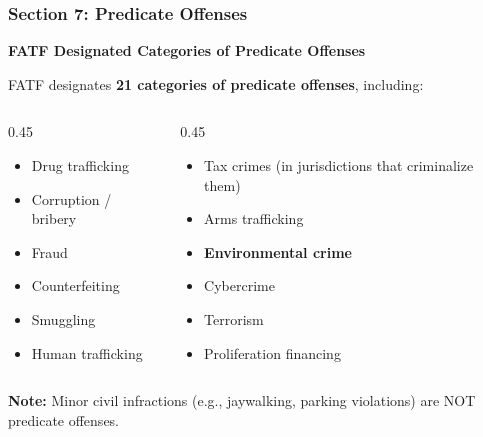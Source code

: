 \documentclass[12pt,aspectratio=169]{beamer}
\renewcommand{\scriptsize}{\fontsize{5}{6}\selectfont}
\newcommand{\keypoint}[1]{\textcolor{deepblue}{\textbf{#1}}}
\begin{document}
	\begin{frame}
		\frametitle{\fontsize{13}{15}\selectfont \textbf{Section 7: Predicate Offenses}}
		\vspace{0.3cm}
		\begin{center}
			{\fontsize{12}{14}\selectfont \textbf{FATF Designated Categories of Predicate Offenses}}
		\end{center}
		\vspace{0.2cm}
		\begin{block}{}
			\scriptsize
			FATF designates \textbf{21 categories of predicate offenses}, including:
			\vspace{0.1cm}
			\begin{columns}[T]
				\begin{column}{0.45\textwidth}
					\begin{itemize}
						\item Drug trafficking
						\item Corruption / bribery
						\item Fraud
						\item Counterfeiting
						\item Smuggling
						\item Human trafficking
					\end{itemize}
				\end{column}
				\begin{column}{0.45\textwidth}
					\begin{itemize}
						\item Tax crimes (in jurisdictions that criminalize them)
						\item Arms trafficking
						\item \textbf{Environmental crime}
						\item Cybercrime
						\item Terrorism
						\item Proliferation financing
					\end{itemize}
				\end{column}
			\end{columns}
			\vspace{0.1cm}
			\keypoint{Note:} Minor civil infractions (e.g., jaywalking, parking violations) are NOT predicate offenses.
		\end{block}
	\end{frame}
	
\end{document}

